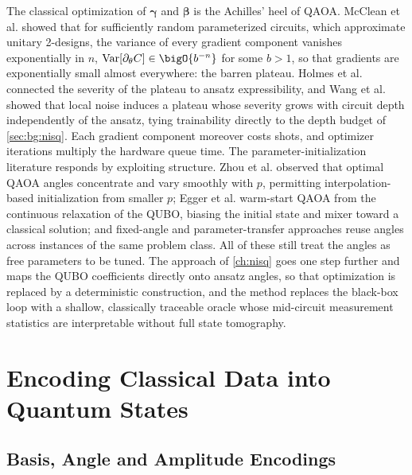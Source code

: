 The classical optimization of $\bm{\gamma}$ and $\bm{\beta}$ is the Achilles' heel of QAOA. McClean et al. \cite{mcclean2018barren} showed that for sufficiently random parameterized circuits, which approximate unitary 2-designs, the variance of every gradient component vanishes exponentially in $n$, $\mathrm{Var}[\partial_{\theta}C]\in\bigO{b^{-n}}$ for some $b>1$, so that gradients are exponentially small almost everywhere: the barren plateau. Holmes et al. \cite{holmes2022expressibility} connected the severity of the plateau to ansatz expressibility, and Wang et al. \cite{wang2021noisebp} showed that local noise induces a plateau whose severity grows with circuit depth independently of the ansatz, tying trainability directly to the depth budget of \cref{sec:bg:nisq}. Each gradient component moreover costs shots, and optimizer iterations multiply the hardware queue time. The parameter-initialization literature responds by exploiting structure. Zhou et al. \cite{zhou2020qaoa} observed that optimal QAOA angles concentrate and vary smoothly with $p$, permitting interpolation-based initialization from smaller $p$; Egger et al. \cite{egger2021warmstart} warm-start QAOA from the continuous relaxation of the QUBO, biasing the initial state and mixer toward a classical solution; and fixed-angle and parameter-transfer approaches reuse angles across instances of the same problem class. All of these still treat the angles as free parameters to be tuned. The \deal{} approach of \cref{ch:nisq} \cite{guo2025deal} goes one step further and maps the QUBO coefficients directly onto ansatz angles, so that optimization is replaced by a deterministic construction, and the \qawa{} method \cite{guo2025qawa} replaces the black-box loop with a shallow, classically traceable oracle whose mid-circuit measurement statistics are interpretable without full state tomography.

\section{Encoding Classical Data into Quantum States}\label{sec:bg:encoding}

\subsection{Basis, Angle and Amplitude Encodings}

